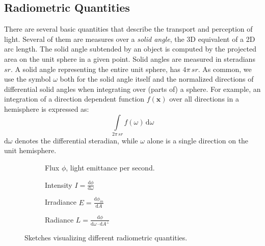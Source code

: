 \documentclass[thesis.tex]{subfiles}
\begin{document}
\subsection{Radiometric Quantities}
There are several basic quantities that describe the transport and perception of light.
Several of them are measures over a \emph{solid angle}, the 3D equivalent of a 2D arc length.
The solid angle subtended by an object is computed by the projected area on the unit sphere in a given point.
Solid angles are measured in steradians $sr$.
A solid angle representing the entire unit sphere, has $4\pi\,sr$.
As common, we use the symbol $\omega$ both for the solid angle itself and the normalized directions of differential solid angles when integrating over (parts of) a sphere.
For example, an integration of a direction dependent function $f(\mathbf{x})$ over all directions in a hemisphere is expressed as:
\begin{equation}
\int\limits_{2\pi\,sr} f(\omega) \, \mathrm{d}\omega
\end{equation} 
$\mathrm{d}\omega$ denotes the differential steradian, while $\omega$ alone is a single direction on the unit hemisphere. 

\begin{figure}[h]
\centering
\begin{subfigure}[b]{0.45\textwidth}
\centering
{}
\caption{Flux $\phi$, light emittance per second.}
\label{fig:flux}
\end{subfigure}
\begin{subfigure}[b]{0.45\textwidth}
\centering
{}
\caption{Intensity $I = \frac{\mathrm{d}\phi}{\mathrm{d}\omega}$}
\label{fig:intensity}
\end{subfigure}

\vspace{10pt}

\begin{subfigure}[b]{0.45\textwidth}
\centering
{}
\caption{Irradiance $E = \frac{\mathrm{d}\phi_{in}}{\mathrm{d}A}$}
\label{fig:irradiance}
\end{subfigure}
\begin{subfigure}[b]{0.45\textwidth}
\centering
{}
\caption{Radiance $L = \frac{\mathrm{d}\phi}{\mathrm{d}\omega \cdot \mathrm{d}A^\perp }$}
\label{fig:radiance}
\end{subfigure}
\caption{Sketches visualizing different radiometric quantities.}
\end{figure}
\end{document}
